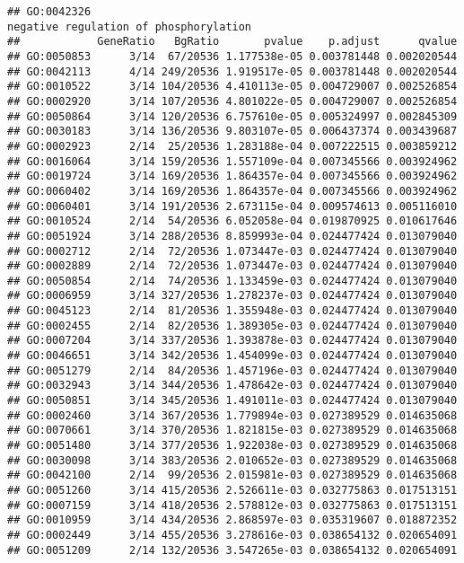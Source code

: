 \documentclass[
]{article}
\begin{document}
\begin{verbatim}
## GO:0042326                                                                                                           negative regulation of phosphorylation
##            GeneRatio   BgRatio       pvalue    p.adjust      qvalue
## GO:0050853      3/14  67/20536 1.177538e-05 0.003781448 0.002020544
## GO:0042113      4/14 249/20536 1.919517e-05 0.003781448 0.002020544
## GO:0010522      3/14 104/20536 4.410113e-05 0.004729007 0.002526854
## GO:0002920      3/14 107/20536 4.801022e-05 0.004729007 0.002526854
## GO:0050864      3/14 120/20536 6.757610e-05 0.005324997 0.002845309
## GO:0030183      3/14 136/20536 9.803107e-05 0.006437374 0.003439687
## GO:0002923      2/14  25/20536 1.283188e-04 0.007222515 0.003859212
## GO:0016064      3/14 159/20536 1.557109e-04 0.007345566 0.003924962
## GO:0019724      3/14 169/20536 1.864357e-04 0.007345566 0.003924962
## GO:0060402      3/14 169/20536 1.864357e-04 0.007345566 0.003924962
## GO:0060401      3/14 191/20536 2.673115e-04 0.009574613 0.005116010
## GO:0010524      2/14  54/20536 6.052058e-04 0.019870925 0.010617646
## GO:0051924      3/14 288/20536 8.859993e-04 0.024477424 0.013079040
## GO:0002712      2/14  72/20536 1.073447e-03 0.024477424 0.013079040
## GO:0002889      2/14  72/20536 1.073447e-03 0.024477424 0.013079040
## GO:0050854      2/14  74/20536 1.133459e-03 0.024477424 0.013079040
## GO:0006959      3/14 327/20536 1.278237e-03 0.024477424 0.013079040
## GO:0045123      2/14  81/20536 1.355948e-03 0.024477424 0.013079040
## GO:0002455      2/14  82/20536 1.389305e-03 0.024477424 0.013079040
## GO:0007204      3/14 337/20536 1.393878e-03 0.024477424 0.013079040
## GO:0046651      3/14 342/20536 1.454099e-03 0.024477424 0.013079040
## GO:0051279      2/14  84/20536 1.457196e-03 0.024477424 0.013079040
## GO:0032943      3/14 344/20536 1.478642e-03 0.024477424 0.013079040
## GO:0050851      3/14 345/20536 1.491011e-03 0.024477424 0.013079040
## GO:0002460      3/14 367/20536 1.779894e-03 0.027389529 0.014635068
## GO:0070661      3/14 370/20536 1.821815e-03 0.027389529 0.014635068
## GO:0051480      3/14 377/20536 1.922038e-03 0.027389529 0.014635068
## GO:0030098      3/14 383/20536 2.010652e-03 0.027389529 0.014635068
## GO:0042100      2/14  99/20536 2.015981e-03 0.027389529 0.014635068
## GO:0051260      3/14 415/20536 2.526611e-03 0.032775863 0.017513151
## GO:0007159      3/14 418/20536 2.578812e-03 0.032775863 0.017513151
## GO:0010959      3/14 434/20536 2.868597e-03 0.035319607 0.018872352
## GO:0002449      3/14 455/20536 3.278616e-03 0.038654132 0.020654091
## GO:0051209      2/14 132/20536 3.547265e-03 0.038654132 0.020654091

\end{verbatim}
\end{document}
